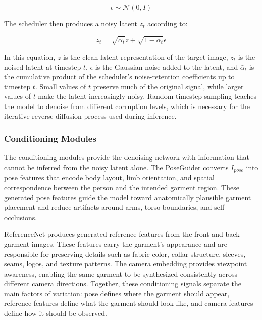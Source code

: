 \begin{equation}
\epsilon \sim \mathcal{N}(0, I)
\end{equation}

The scheduler then produces a noisy latent \(z_t\) according to:

\begin{equation}
z_t = \sqrt{\bar{\alpha}_t} z + \sqrt{1 - \bar{\alpha}_t}\epsilon
\end{equation}

In this equation, \(z\) is the clean latent representation of the target image, \(z_t\) is the noised latent at timestep \(t\), \(\epsilon\) is the Gaussian noise added to the latent, and \(\bar{\alpha}_t\) is the cumulative product of the scheduler's noise-retention coefficients up to timestep \(t\). Small values of \(t\) preserve much of the original signal, while larger values of \(t\) make the latent increasingly noisy. Random timestep sampling teaches the model to denoise from different corruption levels, which is necessary for the iterative reverse diffusion process used during inference.

\subsubsection*{Conditioning Modules}
The conditioning modules provide the denoising network with information that cannot be inferred from the noisy latent alone. The PoseGuider converts \(I_{pose}\) into pose features that encode body layout, limb orientation, and spatial correspondence between the person and the intended garment region. These generated pose features guide the model toward anatomically plausible garment placement and reduce artifacts around arms, torso boundaries, and self-occlusions.

ReferenceNet produces generated reference features from the front and back garment images. These features carry the garment's appearance and are responsible for preserving details such as fabric color, collar structure, sleeves, seams, logos, and texture patterns. The camera embedding provides viewpoint awareness, enabling the same garment to be synthesized consistently across different camera directions. Together, these conditioning signals separate the main factors of variation: pose defines where the garment should appear, reference features define what the garment should look like, and camera features define how it should be observed.

